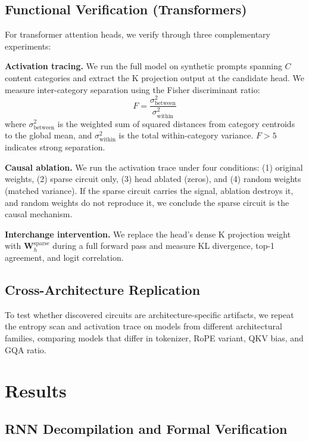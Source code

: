 \documentclass[11pt]{article}
\begin{document}
\subsection{Functional Verification (Transformers)}
\label{sec:funcverify}

For transformer attention heads, we verify through three complementary experiments:

\textbf{Activation tracing.} We run the full model on synthetic prompts spanning $C$ content categories and extract the K projection output at the candidate head. We measure inter-category separation using the Fisher discriminant ratio:
\begin{equation}
  F = \frac{\sigma^2_\text{between}}{\sigma^2_\text{within}}
\end{equation}
where $\sigma^2_\text{between}$ is the weighted sum of squared distances from category centroids to the global mean, and $\sigma^2_\text{within}$ is the total within-category variance. $F > 5$ indicates strong separation.

\textbf{Causal ablation.} We run the activation trace under four conditions: (1) original weights, (2) sparse circuit only, (3) head ablated (zeros), and (4) random weights (matched variance). If the sparse circuit carries the signal, ablation destroys it, and random weights do not reproduce it, we conclude the sparse circuit is the causal mechanism.

\textbf{Interchange intervention.} \label{sec:interchange} We replace the head's dense K projection weight with $\mathbf{W}_h^\text{sparse}$ during a full forward pass and measure KL divergence, top-1 agreement, and logit correlation.

\subsection{Cross-Architecture Replication}

To test whether discovered circuits are architecture-specific artifacts, we repeat the entropy scan and activation trace on models from different architectural families, comparing models that differ in tokenizer, RoPE variant, QKV bias, and GQA ratio.

\section{Results}

\subsection{RNN Decompilation and Formal Verification}
\end{document}
